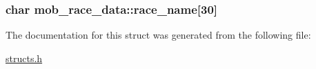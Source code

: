 \hypertarget{structmob__race__data_a389ae9d25a4f59ffc2d555e3825c1112}{
\subsubsection[{race\-\_\-name}]{\setlength{\rightskip}{0pt plus 5cm}char mob\-\_\-race\-\_\-data\-::race\-\_\-name\mbox{[}30\mbox{]}}}\label{structmob__race__data_a389ae9d25a4f59ffc2d555e3825c1112}


The documentation for this struct was generated from the following file\-:\begin{DoxyCompactItemize}
\item 
\hyperlink{structs_8h}{structs.\-h}\end{DoxyCompactItemize}
